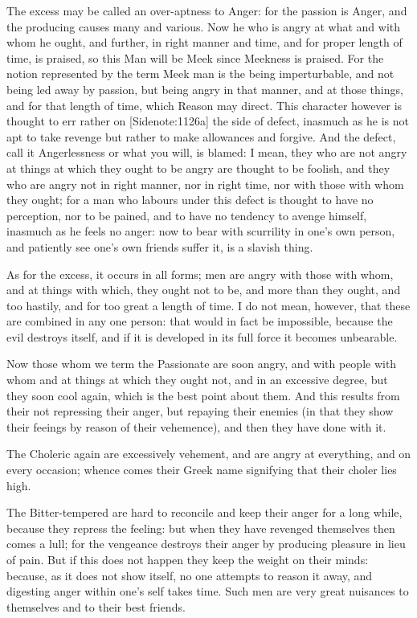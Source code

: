 The excess may be called an over-aptness to Anger: for the passion is
Anger, and the producing causes many and various. Now he who is angry at
what and with whom he ought, and further, in right manner and time, and
for proper length of time, is praised, so this Man will be Meek since
Meekness is praised. For the notion represented by the term Meek man is
the being imperturbable, and not being led away by passion, but being
angry in that manner, and at those things, and for that length of time,
which Reason may direct. This character however is thought to err rather
on [Sidenote:1126a] the side of defect, inasmuch as he is not apt to
take revenge but rather to make allowances and forgive. And the defect,
call it Angerlessness or what you will, is blamed: I mean, they who are
not angry at things at which they ought to be angry are thought to be
foolish, and they who are angry not in right manner, nor in right time,
nor with those with whom they ought; for a man who labours under this
defect is thought to have no perception, nor to be pained, and to have
no tendency to avenge himself, inasmuch as he feels no anger: now to
bear with scurrility in one's own person, and patiently see one's own
friends suffer it, is a slavish thing.

As for the excess, it occurs in all forms; men are angry with those with
whom, and at things with which, they ought not to be, and more than they
ought, and too hastily, and for too great a length of time. I do not
mean, however, that these are combined in any one person: that would
in fact be impossible, because the evil destroys itself, and if it is
developed in its full force it becomes unbearable.

Now those whom we term the Passionate are soon angry, and with people
with whom and at things at which they ought not, and in an excessive
degree, but they soon cool again, which is the best point about them.
And this results from their not repressing their anger, but repaying
their enemies (in that they show their feeings by reason of their
vehemence), and then they have done with it.

The Choleric again are excessively vehement, and are angry at
everything, and on every occasion; whence comes their Greek name
signifying that their choler lies high.

The Bitter-tempered are hard to reconcile and keep their anger for
a long while, because they repress the feeling: but when they have
revenged themselves then comes a lull; for the vengeance destroys their
anger by producing pleasure in lieu of pain. But if this does not happen
they keep the weight on their minds: because, as it does not show
itself, no one attempts to reason it away, and digesting anger within
one's self takes time. Such men are very great nuisances to themselves
and to their best friends.

